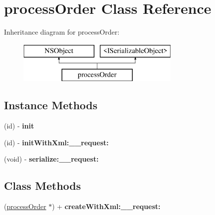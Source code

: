 \hypertarget{interfaceprocess_order}{}\section{process\+Order Class Reference}
\label{interfaceprocess_order}
Inheritance diagram for process\+Order\+:\begin{figure}[H]
\begin{center}
\leavevmode
\includegraphics[height=2.000000cm]{interfaceprocess_order}
\end{center}
\end{figure}
\subsection*{Instance Methods}
\begin{DoxyCompactItemize}
\item 
\hypertarget{interfaceprocess_order_a0e80537da87c20ba8deef5182cbea725}{}(id) -\/ {\bfseries init}\label{interfaceprocess_order_a0e80537da87c20ba8deef5182cbea725}

\item 
\hypertarget{interfaceprocess_order_a26697d085f83b1bdcb04c99928a76cc8}{}(id) -\/ {\bfseries init\+With\+Xml\+:\+\_\+\+\_\+request\+:}\label{interfaceprocess_order_a26697d085f83b1bdcb04c99928a76cc8}

\item 
\hypertarget{interfaceprocess_order_abd5bc8189d033cec160c9dc934350065}{}(void) -\/ {\bfseries serialize\+:\+\_\+\+\_\+request\+:}\label{interfaceprocess_order_abd5bc8189d033cec160c9dc934350065}

\end{DoxyCompactItemize}
\subsection*{Class Methods}
\begin{DoxyCompactItemize}
\item 
\hypertarget{interfaceprocess_order_a795ee5d37fda9d7d7d6cdbade31f3a86}{}(\hyperlink{interfaceprocess_order}{process\+Order} $\ast$) + {\bfseries create\+With\+Xml\+:\+\_\+\+\_\+request\+:}\label{interfaceprocess_order_a795ee5d37fda9d7d7d6cdbade31f3a86}

\end{DoxyCompactItemize}

